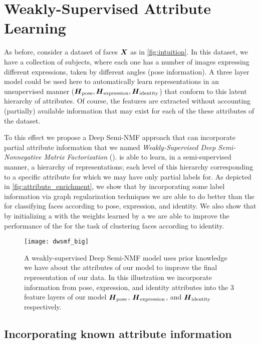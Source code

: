 \documentclass[10pt,journal,compsoc]{IEEEtran}
\begin{document}
\section{Weakly-Supervised Attribute Learning}\label{sec:apriori}

As before, consider a dataset of faces $\boldsymbol{X}$ as in \autoref{fig:intuition}. In this dataset, we have a collection of subjects, where each one has a number of images expressing different expressions, taken by different angles (pose information). A three layer \deepseminmf model could be used here to automatically learn representations in an unsupervised manner ($\boldsymbol{H}_{\text{pose}}, \boldsymbol{H}_{\text{expression}}, \boldsymbol{H}_{\text{identity}}$) that conform to this latent hierarchy of attributes. Of course, the features are extracted without accounting (partially) available information that may exist for each of the these attributes of the dataset.

To this effect we propose a Deep Semi-NMF approach that can incorporate partial attribute information that we named \textsl{Weakly-Supervised Deep Semi-Nonnegative Matrix Factorization} (\dwsf). \dwsf is able to learn, in a semi-supervised manner, a hierarchy of representations; each level of this hierarchy corresponding to a specific attribute for which we may have only partial labels for. As depicted in \autoref{fig:attribute_enrichment}, we show that by incorporating some label information via graph regularization techniques we are able to do better than the \deepseminmf for classifying faces according to pose, expression, and identity. We also show that by initializing a \deepseminmf with the weights learned by a \dwsf we are able to improve the performance of the \deepseminmf for the task of clustering faces according to identity.


\begin{figure*}[hptb]
\centering
\texttt{[image: dwsmf\_big]}
\caption{A weakly-supervised Deep Semi-NMF model uses prior knowledge we have about the attributes of our model to improve the final representation of our data. In this illustration we incorporate information from pose, expression, and identity attributes into the 3 feature layers of our model $\boldsymbol{H}_{\text{pose}}$, $\boldsymbol{H}_{\text{expression}}$, and $\boldsymbol{H}_{\text{identity}}$ respectively. }
\label{fig:attribute_enrichment}
\end{figure*}


\subsection{Incorporating known attribute information}
\end{document}
